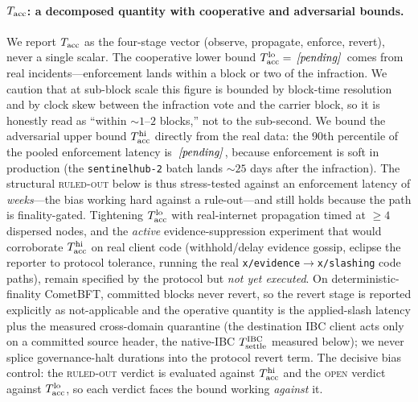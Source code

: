\paragraph{$T_{\mathrm{acc}}$: a decomposed quantity with cooperative and adversarial bounds.}
We report $T_{\mathrm{acc}}$ as the four-stage vector (observe, propagate, enforce, revert), never a single
scalar. The cooperative lower bound $T_{\mathrm{acc}}^{\mathrm{lo}}=\,\textit{[pending]}\,$ comes from real
incidents---enforcement lands within a block or two of the infraction. We caution that at sub-block
scale this figure is bounded by block-time resolution and by clock skew between the infraction vote
and the carrier block, so it is honestly read as ``within ${\sim}1$--$2$ blocks,'' not to the
sub-second. We bound the adversarial upper bound $T_{\mathrm{acc}}^{\mathrm{hi}}$ directly from the real data:
the $90$th percentile of the pooled enforcement latency is $\,\textit{[pending]}\,$, because
enforcement is soft in production (the \texttt{sentinelhub-2} batch lands ${\sim}25$ days after the
infraction). The structural \textsc{ruled-out} below is thus stress-tested against an enforcement
latency of \emph{weeks}---the bias working hard against a rule-out---and still holds because the path
is finality-gated. Tightening $T_{\mathrm{acc}}^{\mathrm{lo}}$ with real-internet propagation timed at $\ge 4$
dispersed nodes, and the \emph{active} evidence-suppression experiment that would corroborate
$T_{\mathrm{acc}}^{\mathrm{hi}}$ on real client code (withhold/delay evidence gossip, eclipse the reporter to
protocol tolerance, running the real \texttt{x/evidence}$\to$\texttt{x/slashing} code paths), remain
specified by the protocol but \emph{not yet executed}. On
deterministic-finality CometBFT, committed blocks never revert, so the revert stage is reported
explicitly as not-applicable and the operative quantity is the applied-slash latency plus the
measured cross-domain quarantine (the destination IBC client acts only on a committed source header,
the native-IBC $T_{\mathrm{settle}}^{\mathrm{IBC}}$ measured below); we
never splice governance-halt durations into the protocol revert term. The decisive bias control:
the \textsc{ruled-out} verdict is evaluated against $T_{\mathrm{acc}}^{\mathrm{hi}}$ and the \textsc{open}
verdict against $T_{\mathrm{acc}}^{\mathrm{lo}}$, so each verdict faces the bound working \emph{against} it.

